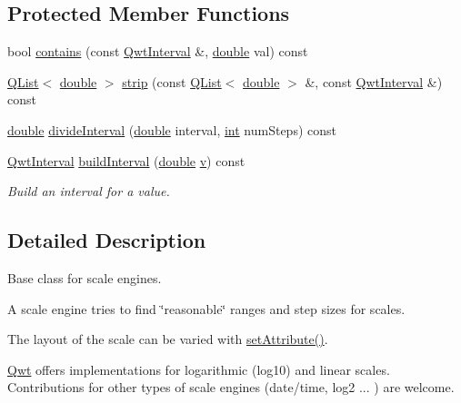 \subsection*{Protected Member Functions}
\begin{DoxyCompactItemize}
\item 
bool \hyperlink{class_qwt_scale_engine_a36acba98650d011f784641fa4ac43f87}{contains} (const \hyperlink{class_qwt_interval}{Qwt\-Interval} \&, \hyperlink{_super_l_u_support_8h_a8956b2b9f49bf918deed98379d159ca7}{double} val) const 
\item 
\hyperlink{class_q_list}{Q\-List}$<$ \hyperlink{_super_l_u_support_8h_a8956b2b9f49bf918deed98379d159ca7}{double} $>$ \hyperlink{class_qwt_scale_engine_ab2b5b3c6081e1d0007f904dbc3f9f7f1}{strip} (const \hyperlink{class_q_list}{Q\-List}$<$ \hyperlink{_super_l_u_support_8h_a8956b2b9f49bf918deed98379d159ca7}{double} $>$ \&, const \hyperlink{class_qwt_interval}{Qwt\-Interval} \&) const 
\item 
\hyperlink{_super_l_u_support_8h_a8956b2b9f49bf918deed98379d159ca7}{double} \hyperlink{class_qwt_scale_engine_aff30158c5ccfee78f4c3e01c0fb5f4de}{divide\-Interval} (\hyperlink{_super_l_u_support_8h_a8956b2b9f49bf918deed98379d159ca7}{double} interval, \hyperlink{ioapi_8h_a787fa3cf048117ba7123753c1e74fcd6}{int} num\-Steps) const 
\item 
\hyperlink{class_qwt_interval}{Qwt\-Interval} \hyperlink{class_qwt_scale_engine_ac9d1a77655b633ee4f165eb5c43a4374}{build\-Interval} (\hyperlink{_super_l_u_support_8h_a8956b2b9f49bf918deed98379d159ca7}{double} \hyperlink{glext_8h_a14cfbe2fc2234f5504618905b69d1e06}{v}) const 
\begin{DoxyCompactList}\small\item\em Build an interval for a value. \end{DoxyCompactList}\end{DoxyCompactItemize}


\subsection{Detailed Description}
Base class for scale engines. 

A scale engine tries to find \char`\"{}reasonable\char`\"{} ranges and step sizes for scales.

The layout of the scale can be varied with \hyperlink{class_qwt_scale_engine_acf02a88f6e778edbc9e005960f35b3b7}{set\-Attribute()}.

\hyperlink{namespace_qwt}{Qwt} offers implementations for logarithmic (log10) and linear scales. Contributions for other types of scale engines (date/time, log2 ... ) are welcome. 

